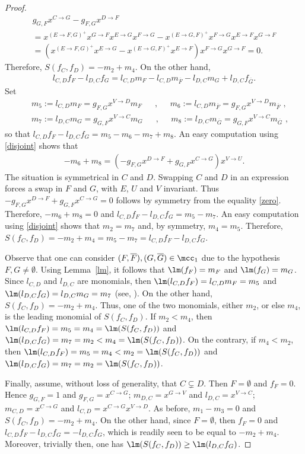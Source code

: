 \begin{proof}
\begin{multline}\label{zero}
g_{G,F}x^{C\to G}-g_{F,G}x^{D\to F}\\
=x^{(E\to F,G)^{+}}x^{G\to F}x^{E\to G}x^{F\to G}-
x^{(E\to G,F)^{+}}x^{F\to G}x^{E\to F}x^{G\to F}\\
=(x^{(E\to F,G)^{+}}x^{E\to G}-x^{(E\to G,F)^{+}}x^{E\to F})x^{F\to G}x^{G\to F}=0.
\end{multline}
Therefore, $S(f_C,f_D)=-m_2+m_4$. On the other hand,
\begin{eqnarray*}
l_{C,D}f_F-l_{D,C}f_G=l_{C,D}m_F-l_{C,D}m_{\overline{F}}-
l_{D,C}m_G+l_{D,C}f_{\overline{G}}.
\end{eqnarray*}
Set
\begin{eqnarray*}
&&m_5:=l_{C,D}m_{F}=g_{F,G}x^{V\to D}m_F\phantom{+}\mbox{ ,
  }\phantom{+} m_6:=l_{C,D}m_{\overline{F}}=g_{F,G}x^{V\to
    D}m_{\overline{F}}\mbox{ , }\\&& m_7:=l_{D,C}m_G=g_{G,F}x^{V\to
    C}m_G\phantom{+}\mbox{ ,
  }\phantom{+}m_8:=l_{D,C}m_{\overline{G}}=g_{G,F}x^{V\to
    C}m_{\overline{G}}\mbox{ , }
\end{eqnarray*}
so that $l_{C,D}f_F-l_{D,C}f_G=m_5-m_6-m_7+m_8$. An easy computation
using \eqref{disjoint} shows that
\begin{eqnarray*}
-m_6+m_8=(-g_{F,G}x^{D\to F}+g_{G,F}x^{C\to G})x^{V\to U}.
\end{eqnarray*}
The situation is symmetrical in $C$ and $D$. Swapping $C$ and $D$ in
an expression forces a swap in $F$ and $G$, with $E$, $U$ and $V$
invariant. Thus $-g_{F,G}x^{D\to F}+g_{G,F}x^{C\to G}=0$ follows by
symmetry from the equality \eqref{zero}. Therefore, $-m_6+m_8=0$ and
$l_{C,D}f_F-l_{D,C}f_G=m_5-m_7$. An easy computation using
\eqref{disjoint} shows that $m_2=m_7$ and, by symmetry,
$m_4=m_5$. Therefore,
$S(f_C,f_D)=-m_2+m_4=m_5-m_7=l_{C,D}f_F-l_{D,C}f_G$.

Observe that one can consider
$(F,\overline{F}),(G,\overline{G})\in\mcc_1$ due to the hypothesis
$F,G\neq\emptyset$. Using Lemma~\ref{lm}, it follows that
$\lm(f_F)=m_F$ and $\lm(f_G)=m_G$. Since $l_{C,D}$ and $l_{D,C}$ are
monomials, then $\lm(l_{C,D}f_F)=l_{C,D}m_F=m_5$ and
$\lm(l_{D,C}f_G)=l_{D,C}m_G=m_7$ (see, \eg \cite[\S2.2,
  Exercise~11]{clo}).  On the other hand, $S(f_C,f_D)=-m_2+m_4$. Thus,
one of the two monomials, either $m_2$, or else $m_4$, is the leading
monomial of $S(f_C,f_D)$. If $m_2<m_4$, then
$\lm(l_{C,D}f_F)=m_5=m_4=\lm(S(f_C,f_D))$ and
$\lm(l_{D,C}f_G)=m_7=m_2<m_4=\lm(S(f_C,f_D))$. On the contrary, if
$m_4<m_2$, then $\lm(l_{C,D}f_F)=m_5=m_4<m_2=\lm(S(f_C,f_D))$ and
$\lm(l_{D,C}f_G)=m_7=m_2=\lm(S(f_C,f_D))$.

Finally, assume, without loss of generality, that $C\subsetneq
D$. Then $F=\emptyset$ and $f_F=0$. Hence $g_{G,F}=1$ and
$g_{F,G}=x^{C\to G}$; $m_{D,C}=x^{G\to V}$ and $l_{D,C}=x^{V\to C}$;
$m_{C,D}=x^{C\to G}$ and $l_{C,D}=x^{C\to G}x^{V\to D}$. As before,
$m_1-m_3=0$ and $S(f_C,f_D)=-m_2+m_4$. On the other hand, since
$F=\emptyset$, then $f_F=0$ and $l_{C,D}f_F-l_{D,C}f_G=-l_{D,C}f_G$,
which is readily seen to be equal to $-m_2+m_4$. Moreover, trivially
then, one has $\lm(S(f_C,f_D))\geq\lm(l_{D,C}f_G)$.
\end{proof}

